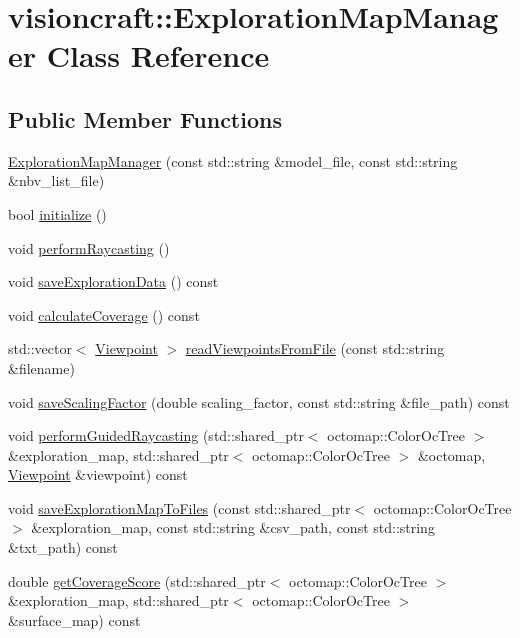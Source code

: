\hypertarget{classvisioncraft_1_1ExplorationMapManager}{}\section{visioncraft\+:\+:Exploration\+Map\+Manager Class Reference}
\label{classvisioncraft_1_1ExplorationMapManager}
\subsection*{Public Member Functions}
\begin{DoxyCompactItemize}
\item 
\hyperlink{classvisioncraft_1_1ExplorationMapManager_a4511423dad539ba2f868aad4b13806f2}{Exploration\+Map\+Manager} (const std\+::string \&model\+\_\+file, const std\+::string \&nbv\+\_\+list\+\_\+file)
\item 
bool \hyperlink{classvisioncraft_1_1ExplorationMapManager_a4118906997c8a7dca5eb84519725a001}{initialize} ()
\item 
void \hyperlink{classvisioncraft_1_1ExplorationMapManager_a7aedf7592bdd591d87717bceb076d1f8}{perform\+Raycasting} ()
\item 
void \hyperlink{classvisioncraft_1_1ExplorationMapManager_a9ed23d94e022dafcd5b0d2a53f640461}{save\+Exploration\+Data} () const
\item 
void \hyperlink{classvisioncraft_1_1ExplorationMapManager_a79996ce9708c71e71d504cecda3c75de}{calculate\+Coverage} () const
\item 
std\+::vector$<$ \hyperlink{classvisioncraft_1_1Viewpoint}{Viewpoint} $>$ \hyperlink{classvisioncraft_1_1ExplorationMapManager_a095e13f3f1d13bcc5f7efa2a57ac77f7}{read\+Viewpoints\+From\+File} (const std\+::string \&filename)
\item 
void \hyperlink{classvisioncraft_1_1ExplorationMapManager_a541f5daf89fefd5095e923f044c8ac15}{save\+Scaling\+Factor} (double scaling\+\_\+factor, const std\+::string \&file\+\_\+path) const
\item 
void \hyperlink{classvisioncraft_1_1ExplorationMapManager_aed32473c33a1e2eb33fd77d9ea9f42f3}{perform\+Guided\+Raycasting} (std\+::shared\+\_\+ptr$<$ octomap\+::\+Color\+Oc\+Tree $>$ \&exploration\+\_\+map, std\+::shared\+\_\+ptr$<$ octomap\+::\+Color\+Oc\+Tree $>$ \&octomap, \hyperlink{classvisioncraft_1_1Viewpoint}{Viewpoint} \&viewpoint) const
\item 
void \hyperlink{classvisioncraft_1_1ExplorationMapManager_aa57753cb552d9d7ec0cc9b1c4fb7885e}{save\+Exploration\+Map\+To\+Files} (const std\+::shared\+\_\+ptr$<$ octomap\+::\+Color\+Oc\+Tree $>$ \&exploration\+\_\+map, const std\+::string \&csv\+\_\+path, const std\+::string \&txt\+\_\+path) const
\item 
double \hyperlink{classvisioncraft_1_1ExplorationMapManager_af9ef264b750298f630dcdd949b5f1668}{get\+Coverage\+Score} (std\+::shared\+\_\+ptr$<$ octomap\+::\+Color\+Oc\+Tree $>$ \&exploration\+\_\+map, std\+::shared\+\_\+ptr$<$ octomap\+::\+Color\+Oc\+Tree $>$ \&surface\+\_\+map) const
\end{DoxyCompactItemize}


